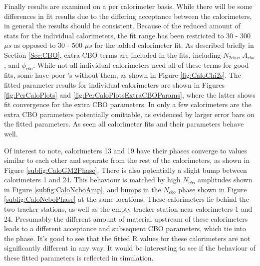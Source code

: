 	Finally results are examined on a per calorimeter basis. While there will be some differences in fit results due to the differing acceptance between the calorimeters, in general the results should be consistent. Because of the reduced amount of stats for the individual calorimeters, the fit range has been restricted to 30 - 300 $\mu s$ as opposed to 30 - 500 $\mu s$ for the added calorimeter fit. As described briefly in Section \ref{Sec:CBO}, extra CBO terms are included in the fits, including $N_{2cbo}$, $A_{cbo}$, and $\phi_{cbo}$. While not all individual calorimeters need all of these terms for good fits, some have poor \chisq's without them, as shown in Figure \ref{fig:CaloChi2s}. The fitted parameter results for individual calorimeters are shown in Figures \ref{fig:PerCaloPlots} and \ref{fig:PerCaloPlotsExtraCBOParams}, where the latter shows fit convergence for the extra CBO parameters. In only a few calorimeters are the extra CBO parameters potentially omittable, as evidenced by larger error bars on the fitted parameters. As seen all calorimeter fits and their parameters behave well.

	Of interest to note, calorimeters 13 and 19 have their \gmtwo phases converge to values similar to each other and separate from the rest of the calorimeters, as shown in Figure \ref{subfig:CaloGM2Phase}. There is also potentially a slight bump between calorimeters 1 and 24. This behaviour is matched by high $N_{cbo}$ amplitudes shown in Figure \ref{subfig:CaloNcboAmp}, and bumps in the $N_{cbo}$ phase shown in Figure \ref{subfig:CaloNcboPhase} at the same locations. These calorimeters lie behind the two tracker stations, as well as the empty tracker station near calorimeters 1 and 24. Presumably the different amount of material upstream of these calorimeters leads to a different acceptance and subsequent CBO parameters, which tie into the \gmtwo phase. It's good to see that the fitted R values for these calorimeters are not significantly different in any way. It would be interesting to see if the behaviour of these fitted parameters is reflected in simulation.

